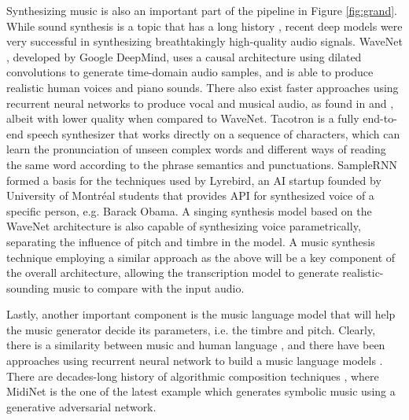 Synthesizing music is also an important part of the pipeline in Figure \ref{fig:grand}.
While sound synthesis is a topic that has a long history \cite{cook2002synthesis}, recent deep models were very successful in synthesizing breathtakingly high-quality audio signals.
WaveNet \cite{van2016wavenet}, developed by Google DeepMind, uses a causal architecture using dilated convolutions to generate time-domain audio samples, and is able to produce realistic human voices and piano sounds.
There also exist faster approaches using recurrent neural networks to produce vocal and musical audio, as found in \cite{nayebi2015gruv} and \cite{kalingeri2016generation}, albeit with lower quality when compared to WaveNet.
Tacotron \cite{wang2017tacotron} is a fully end-to-end speech synthesizer that works directly on a sequence of characters, which can learn the pronunciation of unseen complex words and different ways of reading the same word according to the phrase semantics and punctuations.
SampleRNN \cite{mehri2016samplernn} formed a basis for the techniques used by Lyrebird, an AI startup founded by University of Montr\'{e}al students that provides API for synthesized voice of a specific person, e.g. Barack Obama.
A singing synthesis model \cite{blaauw2017singing} based on the WaveNet architecture is also capable of synthesizing voice parametrically, separating the influence of pitch and timbre in the model.
A music synthesis technique employing a similar approach as the above will be a key component of the overall architecture, allowing the transcription model to generate realistic-sounding music to compare with the input audio.

Lastly, another important component is the music language model that will help the music generator decide its parameters, i.e. the timbre and pitch.
Clearly, there is a similarity between music and human language \cite{patel2010musiclanguage}, and there have been approaches using recurrent neural network to build a music language models \cite{sigtia2014lm}.
There are decades-long history of algorithmic composition techniques \cite{fernandez2013ai}, where MidiNet \cite{yang2017midinet} is the one of the latest example which generates symbolic music using a generative adversarial network.





